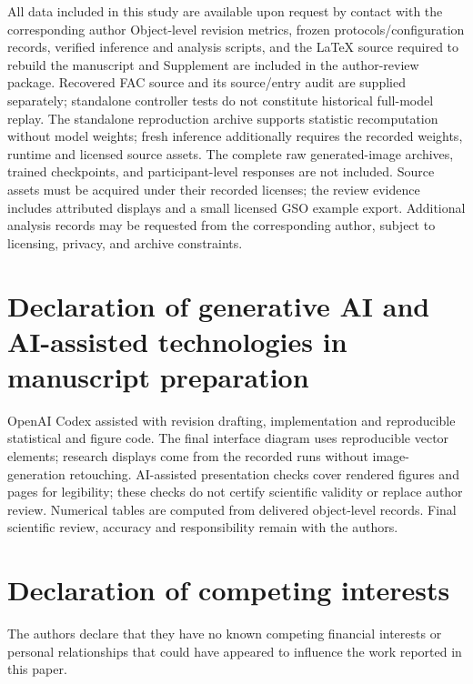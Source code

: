 \documentclass[times,twocolumn,final]{elsarticle}
\providecommand{\DIFadd}[1]{{\protect\color{blue} \sf #1}} %
\providecommand{\DIFdel}[1]{{\protect\color{red} \scriptsize #1}} %
\providecommand{\DIFaddbegin}{} %
\providecommand{\DIFaddend}{} %
\providecommand{\DIFdelbegin}{} %
\providecommand{\DIFdelend}{} %
\begin{document}
\DIFdelbegin \DIFdel{All data included in this study are available upon request by contact with the corresponding author}\DIFdelend \DIFaddbegin \DIFadd{Object-level revision metrics, frozen protocols/configuration records, verified inference and analysis scripts, and the LaTeX source required to rebuild the manuscript and Supplement are included in the author-review package. Recovered FAC source and its source/entry audit are supplied separately; standalone controller tests do not constitute historical full-model replay. The standalone reproduction archive supports statistic recomputation without model weights; fresh inference additionally requires the recorded weights, runtime and licensed source assets. The complete raw generated-image archives, trained checkpoints, and participant-level responses are not included. Source assets must be acquired under their recorded licenses; the review evidence includes attributed displays and a small licensed GSO example export. Additional analysis records may be requested from the corresponding author, subject to licensing, privacy, and archive constraints.
}

\section*{\DIFadd{Declaration of generative AI and AI-assisted technologies in manuscript preparation}}
\DIFadd{OpenAI Codex assisted with revision drafting, implementation and reproducible statistical and figure code. The final interface diagram uses reproducible vector elements; research displays come from the recorded runs without image-generation retouching. AI-assisted presentation checks cover rendered figures and pages for legibility; these checks do not certify scientific validity or replace author review. Numerical tables are computed from delivered object-level records. Final scientific review, accuracy and responsibility remain with the authors}\DIFaddend .

\section*{Declaration of competing interests}

The authors declare that they have no known competing financial interests or personal relationships that could have appeared to influence the work reported in this paper.
\end{document}
